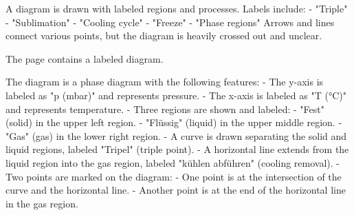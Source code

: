A diagram is drawn with labeled regions and processes.  
Labels include:  
- "Triple"  
- "Sublimation"  
- "Cooling cycle"  
- "Freeze"  
- "Phase regions"  
Arrows and lines connect various points, but the diagram is heavily crossed out and unclear.

The page contains a labeled diagram.  

The diagram is a phase diagram with the following features:  
- The y-axis is labeled as "p (mbar)" and represents pressure.  
- The x-axis is labeled as "T (°C)" and represents temperature.  
- Three regions are shown and labeled:  
  - "Fest" (solid) in the upper left region.  
  - "Flüssig" (liquid) in the upper middle region.  
  - "Gas" (gas) in the lower right region.  
- A curve is drawn separating the solid and liquid regions, labeled "Tripel" (triple point).  
- A horizontal line extends from the liquid region into the gas region, labeled "kühlen abführen" (cooling removal).  
- Two points are marked on the diagram:  
  - One point is at the intersection of the curve and the horizontal line.  
  - Another point is at the end of the horizontal line in the gas region.